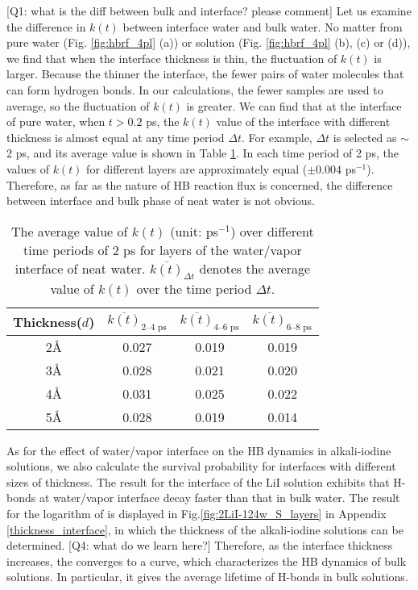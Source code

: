 {\color{red}[Q1: what is the diff between bulk and interface? please comment]}
{\color{blue} Let us examine the difference in $k(t)$ between interface water and bulk water. 
No matter from pure water (Fig. \ref{fig:hbrf_4pl} (a)) 
or solution (Fig. \ref{fig:hbrf_4pl} (b), (c) or (d)), we find that when the interface thickness is thin, the fluctuation of $k(t)$ is larger.
Because the thinner the interface, the fewer pairs of water molecules that can form hydrogen bonds. 
In our calculations, the fewer samples are used to average, so the fluctuation of $k (t)$ is greater. 
We can find that at the interface of pure water, when $t> 0.2$ ps, the $k(t)$ value of the interface with different thickness is almost equal 
at any time period $\Delta t$. For example, $\Delta t$ is selected as $\sim$ 2 ps, 
and its average value is shown in Table \ref{tab:hbrf_neat}. In each time period of 2 ps, the values of $k(t)$ for different layers are approximately equal
($\pm 0.004$ ps$^{-1}$). Therefore, as far as the nature of HB reaction flux is concerned, the difference between interface and bulk phase of neat water is not obvious. 
}
\begin{table}[htbp]
\centering
\caption{\label{tab:hbrf_neat} 
   {\color{blue}The average value of $k(t)$ (unit: ps$^{-1}$) over different time periods of 2 ps for layers of the water/vapor interface of neat water.  
   $\overline{k(t)}_{\Delta t}$ denotes the average value of $k(t)$ over the time period $\Delta t$.} }
\begin{tabular}{cccc}
  Thickness($d$) & $\overline{k(t)}_{\text{2--4 ps}}$ & $\overline{k(t)}_{\text{4--6 ps}}$ & $\overline{k(t)}_{\text{6--8 ps}}$\\
\hline
  2\AA & 0.027 & 0.019 & 0.019\\
  3\AA & 0.028 & 0.021 & 0.020 \\
  4\AA & 0.031 & 0.025 & 0.022 \\
  5\AA & 0.028 & 0.019 & 0.014 
\end{tabular}
\end{table}

As for the effect of water/vapor interface on the HB dynamics in alkali-iodine solutions,
we also calculate the survival probability for interfaces with different sizes of thickness. 
The result for the interface of the LiI solution exhibits that H-bonds at water/vapor 
interface decay faster than that in bulk water.
The result for the logarithm of \SHB is displayed in Fig.\space\ref{fig:2LiI-124w_S_layers} in Appendix \ref{thickness_interface}, 
in which the thickness of the alkali-iodine solutions can be determined.
{\color{red}[Q4: what do we learn here?]}
{\color{blue}Therefore, as the interface thickness increases, the \SHB converges to a curve, 
which characterizes the HB dynamics of bulk solutions. 
In particular, it gives the average lifetime of H-bonds in bulk solutions.}
\FloatBarrier
